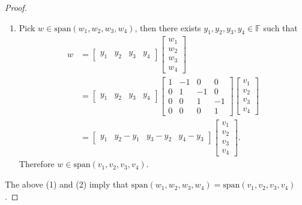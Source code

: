 \begin{proof}
\begin{enumerate}
Therefore $v\in\text{span}(w_1,w_2,w_3,w_4)$.
\item Pick $w\in\text{span}(w_1,w_2,w_3,w_4)$, then there exists $y_1,y_2,y_3,y_4\in\mathbb{F}$ such that
\begin{equation*}
\begin{split}
w&=\begin{bmatrix}
y_1&y_2&y_3&y_4
\end{bmatrix}
\begin{bmatrix}w_1\\w_2\\w_3\\w_4\end{bmatrix}\\
&=\begin{bmatrix}
y_1&y_2&y_3&y_4
\end{bmatrix}
\begin{bmatrix}
1& -1& 0&0\\
0& 1&-1&0\\
0& 0&1&-1\\
0& 0&0&1
\end{bmatrix}
\begin{bmatrix}
v_1\\
v_2\\
v_3\\
v_4\end{bmatrix}\\
&=
\begin{bmatrix}
     y_1&     y_2-y_1&     y_3-y_2&     y_4-y_3
\end{bmatrix}
\begin{bmatrix}
v_1\\
v_2\\
v_3\\
v_4
\end{bmatrix}.
\end{split}
\end{equation*}
Therefore $w\in\text{span}(v_1,v_2,v_3,v_4)$.
\end{enumerate}
The above (1) and (2) imply that $\text{span}(w_1,w_2,w_3,w_4)=\text{span}(v_1,v_2,v_3,v_4)$.
\end{proof}

